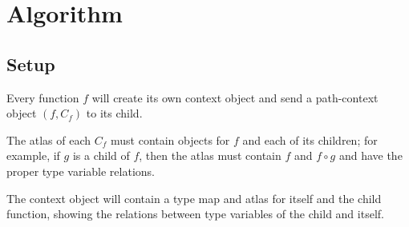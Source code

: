 \documentclass[10pt]{article}
\begin{document}
\pagebreak
\section{Algorithm}

\subsection{Setup}

Every function $f$ will create its own context object and send a path-context
object $(f, C_f)$ to its child.

The atlas of each $C_f$ must contain objects for $f$ and each of its
children; for example, if $g$ is a child of $f$, then the atlas must contain
$f$ and $f \circ g$ and have the proper type variable relations.

The context object will contain a type map and atlas for itself and the child
function, showing the relations between type variables of the child and itself.
\end{document}
